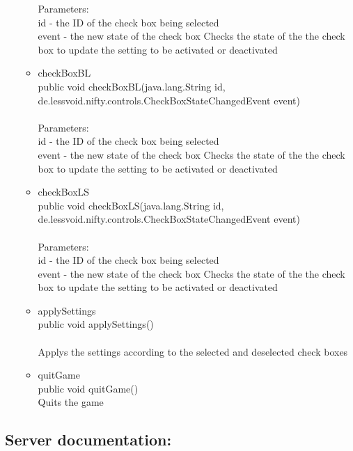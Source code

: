 \documentclass[letterpaper]{article}
\begin{document}
\begin{itemize}
\begin{itemize}
											Parameters: \\
											id - the ID of the check box being selected \\
											event - the new state of the check box Checks the state of the the check box to update the setting to be activated or deactivated
									\item	checkBoxBL \\
											public void checkBoxBL(java.lang.String id, \\
		              de.lessvoid.nifty.controls.CheckBoxStateChangedEvent event) \\ \\
											Parameters: \\
											id - the ID of the check box being selected \\
											event - the new state of the check box Checks the state of the the check box to update the setting to be activated or deactivated
									\item	checkBoxLS \\
											public void checkBoxLS(java.lang.String id, \\
		              de.lessvoid.nifty.controls.CheckBoxStateChangedEvent event) \\ \\
											Parameters: \\
											id - the ID of the check box being selected \\
											event - the new state of the check box Checks the state of the the check box to update the setting to be activated or deactivated
									\item	applySettings \\
											public void applySettings() \\ \\
											Applys the settings according to the selected and deselected check boxes
									\item	quitGame \\
											public void quitGame() \\
											Quits the game
								\end{itemize}
					\end{itemize}
			
			\vspace{0.2in}
			\subsection*{Server documentation:}
			\vspace{0.1in}
			
\end{document}
